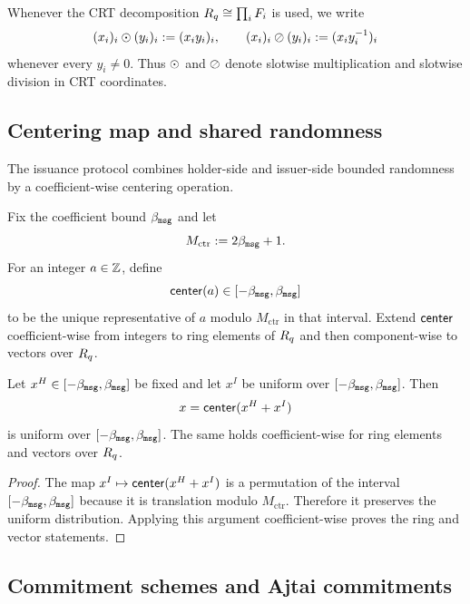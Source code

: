 Whenever the CRT decomposition $R_q\cong\prod_i F_i$ is used, we write
\[
  (x_i)_i\odot(y_i)_i := (x_i y_i)_i,
  \qquad
  (x_i)_i\oslash (y_i)_i := (x_i y_i^{-1})_i
\]
whenever every $y_i\neq 0$.  Thus $\odot$ and $\oslash$ denote slotwise multiplication and slotwise division in
CRT coordinates.

\subsection{Centering map and shared randomness}
\label{subsec:centering}
The issuance protocol combines holder-side and issuer-side bounded randomness by a coefficient-wise
centering operation.

\begin{definition}\label{def:centering}
Fix the coefficient bound $\beta_{\mathtt{msg}}$ and let
\[
  M_{\mathrm{ctr}}:=2\beta_{\mathtt{msg}}+1.
\]
For an integer $a\in\mathbb{Z}$, define
\[
  \mathsf{center}(a)\in[-\beta_{\mathtt{msg}},\beta_{\mathtt{msg}}]
\]
to be the unique representative of $a$ modulo $M_{\mathrm{ctr}}$ in that interval.  Extend $\mathsf{center}$ coefficient-wise
from integers to ring elements of $R_q$ and then component-wise to vectors over $R_q$.
\end{definition}

\begin{lemma}\label{lem:center-uniform}
Let $x^H\in[-\beta_{\mathtt{msg}},\beta_{\mathtt{msg}}]$ be fixed and let $x^I$ be uniform over $[-\beta_{\mathtt{msg}},\beta_{\mathtt{msg}}]$.
Then
\[
  x=\mathsf{center}(x^H+x^I)
\]
is uniform over $[-\beta_{\mathtt{msg}},\beta_{\mathtt{msg}}]$.  The same holds coefficient-wise for ring elements and vectors over
$R_q$.
\end{lemma}

\begin{proof}
The map $x^I\mapsto \mathsf{center}(x^H+x^I)$ is a permutation of the interval $[-\beta_{\mathtt{msg}},\beta_{\mathtt{msg}}]$ because
it is translation modulo $M_{\mathrm{ctr}}$.  Therefore it preserves the uniform distribution.  Applying this
argument coefficient-wise proves the ring and vector statements.
\end{proof}

\subsection{Commitment schemes and Ajtai commitments}
\label{subsec:prelim-commit}
\label{subsec:commitments}

